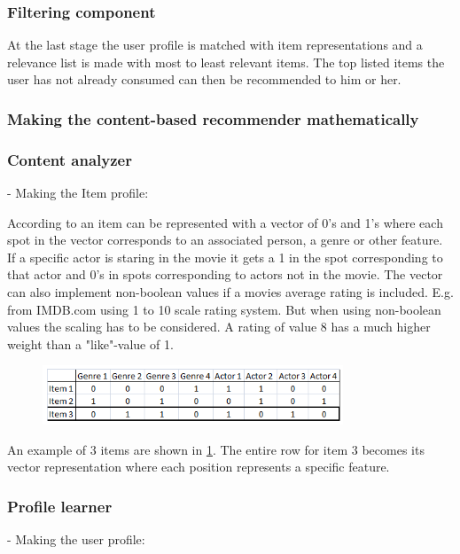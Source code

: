\subsubsection{Filtering component}
At the last stage the user profile is matched with item representations and a relevance list is made with most to least relevant items. The top listed items the user has not already consumed can then be recommended to him or her.
 
\subsubsection{Making the content-based recommender mathematically}

\subsubsection{Content analyzer}
- Making the Item profile:
 
According to \cite{MoMDatasets} an item can be represented with a vector of 0's and 1's where each spot in the vector corresponds to an associated person, a genre or other feature. If a specific actor is staring in the movie it gets a 1 in the spot corresponding to that actor and 0's in spots corresponding to actors not in the movie. The vector can also implement non-boolean values if a movies average rating is included. E.g. from IMDB.com using 1 to 10 scale rating system. But when using non-boolean values the scaling has to be considered. A rating of value 8 has a much higher weight than a "like"-value of 1.

\begin{figure}[H]
\centering
\includegraphics[width=0.8\textwidth]{Images/Vectorrepresentationitems.png}
\caption{}
\label{VrepItem}
\end{figure}

An example of 3 items are shown in \ref{VrepItem}. The entire row for item 3 becomes its vector representation where each position represents a specific feature.  
 
\subsubsection{Profile learner}
- Making the user profile:

